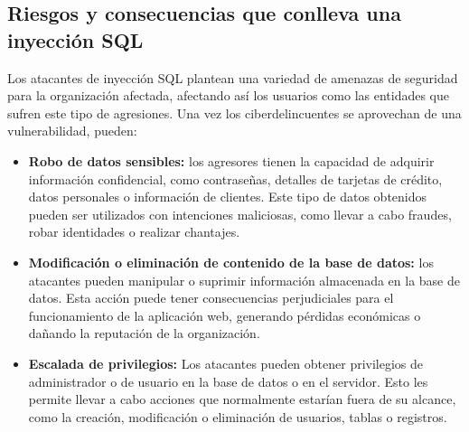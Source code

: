 \documentclass[11pt]{report}
\begin{document}
\subsection{Riesgos y consecuencias que conlleva una inyección SQL}
Los atacantes de inyección SQL plantean una variedad de amenazas de seguridad para la
organización afectada, afectando así los usuarios como las entidades que sufren este tipo
de agresiones. Una vez los ciberdelincuentes se aprovechan de una vulnerabilidad, pueden:
\begin{itemize}
\item \textbf{Robo de datos sensibles:} los agresores tienen la capacidad de adquirir información
confidencial, como contraseñas, detalles de tarjetas de crédito, datos personales o
información de clientes. Este tipo de datos obtenidos pueden ser utilizados con
intenciones maliciosas, como llevar a cabo fraudes, robar identidades o realizar
chantajes.
\item \textbf{Modificación o eliminación de contenido de la base de datos:} los atacantes pueden
manipular o suprimir información almacenada en la base de datos. Esta acción
puede tener consecuencias perjudiciales para el funcionamiento de la aplicación
web, generando pérdidas económicas o dañando la reputación de la organización.
\item \textbf{Escalada de privilegios:} Los atacantes pueden obtener privilegios de administrador o
de usuario en la base de datos o en el servidor. Esto les permite llevar a cabo
acciones que normalmente estarían fuera de su alcance, como la creación,
modificación o eliminación de usuarios, tablas o registros.
\end{itemize}

\cleardoublepage

\end{document}

